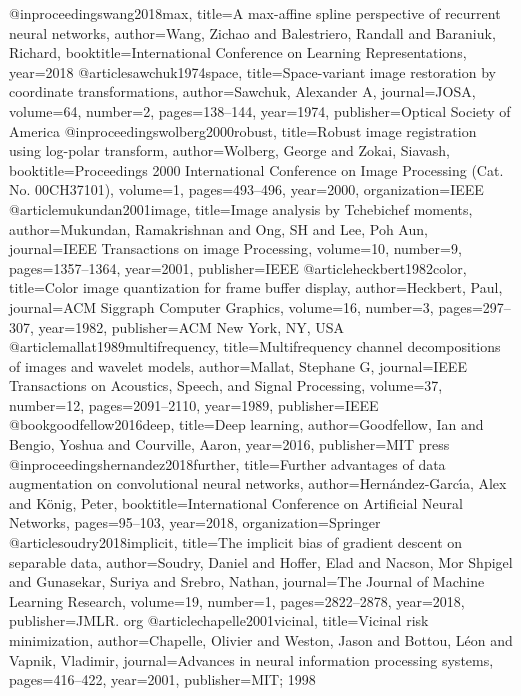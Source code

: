 \documentclass[nohyperref]{article}
\theoremstyle{plain}
\theoremstyle{definition}
\theoremstyle{remark}
\begin{document}
@inproceedings{wang2018max,
  title={A max-affine spline perspective of recurrent neural networks},
  author={Wang, Zichao and Balestriero, Randall and Baraniuk, Richard},
  booktitle={International Conference on Learning Representations},
  year={2018}
}
@article{sawchuk1974space,
  title={Space-variant image restoration by coordinate transformations},
  author={Sawchuk, Alexander A},
  journal={JOSA},
  volume={64},
  number={2},
  pages={138--144},
  year={1974},
  publisher={Optical Society of America}
}
@inproceedings{wolberg2000robust,
  title={Robust image registration using log-polar transform},
  author={Wolberg, George and Zokai, Siavash},
  booktitle={Proceedings 2000 International Conference on Image Processing (Cat. No. 00CH37101)},
  volume={1},
  pages={493--496},
  year={2000},
  organization={IEEE}
}
@article{mukundan2001image,
  title={Image analysis by Tchebichef moments},
  author={Mukundan, Ramakrishnan and Ong, SH and Lee, Poh Aun},
  journal={IEEE Transactions on image Processing},
  volume={10},
  number={9},
  pages={1357--1364},
  year={2001},
  publisher={IEEE}
}
@article{heckbert1982color,
  title={Color image quantization for frame buffer display},
  author={Heckbert, Paul},
  journal={ACM Siggraph Computer Graphics},
  volume={16},
  number={3},
  pages={297--307},
  year={1982},
  publisher={ACM New York, NY, USA}
}
@article{mallat1989multifrequency,
  title={Multifrequency channel decompositions of images and wavelet models},
  author={Mallat, Stephane G},
  journal={IEEE Transactions on Acoustics, Speech, and Signal Processing},
  volume={37},
  number={12},
  pages={2091--2110},
  year={1989},
  publisher={IEEE}
}
@book{goodfellow2016deep,
  title={Deep learning},
  author={Goodfellow, Ian and Bengio, Yoshua and Courville, Aaron},
  year={2016},
  publisher={MIT press}
}
@inproceedings{hernandez2018further,
  title={Further advantages of data augmentation on convolutional neural networks},
  author={Hern{\'a}ndez-Garc{\'\i}a, Alex and K{\"o}nig, Peter},
  booktitle={International Conference on Artificial Neural Networks},
  pages={95--103},
  year={2018},
  organization={Springer}
}
@article{soudry2018implicit,
  title={The implicit bias of gradient descent on separable data},
  author={Soudry, Daniel and Hoffer, Elad and Nacson, Mor Shpigel and Gunasekar, Suriya and Srebro, Nathan},
  journal={The Journal of Machine Learning Research},
  volume={19},
  number={1},
  pages={2822--2878},
  year={2018},
  publisher={JMLR. org}
}
@article{chapelle2001vicinal,
  title={Vicinal risk minimization},
  author={Chapelle, Olivier and Weston, Jason and Bottou, L{\'e}on and Vapnik, Vladimir},
  journal={Advances in neural information processing systems},
  pages={416--422},
  year={2001},
  publisher={MIT; 1998}
}
\end{document}
